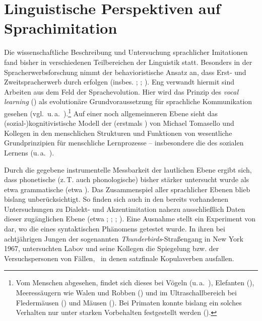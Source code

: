 \section{Linguistische Perspektiven auf Sprachimitation}\label{forschungsgeschichteimitation}
 
Die wissenschaftliche Beschreibung und Untersuchung sprachlicher Imitationen fand bisher in verschiedenen Teilbereichen der Linguistik statt. Besonders in der Spracherwerbsforschung nimmt der behavioristische Ansatz an, dass Erst- und Zweitspracherwerb durch  erfolgen (insbes. \citealt{Fraseretal1963,Uzgiris1981}; \citealt[291–294]{Tauten1997}; \citealt{Markham1997,LightbownSpada2006,MeltzoffMoore1977,MeltzoffMoore1983,MeltzoffMoore1989,MetzoffPrinz2002}). Eng verwandt hiermit sind Arbeiten aus dem Feld der Sprachevolution.
 Hier wird das Prinzip des \textit{vocal learning} () als evolutionäre Grundvoraussetzung für sprachliche Kommunikation gesehen (vgl.\, u.\,a.\, \citealt{Fitch2010,HauserChomskyFitch2002,Petkov2012}).\footnote{Vom Menschen abgesehen, findet sich dieses bei Vögeln (u.\,a.\, \citealt{Lipkind2013}), Elefanten (\citealt{Poole2005}), Meeressäugern wie Walen und Robben (\citealt{JanikSlater1997,Ralls1985}) und im Ultraschallbereich bei Fledermäusen (\citealt{Boughman1998}) und Mäusen (\citealt{Arriaga2012}). Bei Primaten konnte bislang ein solches Verhalten nur unter starken Vorbehalten festgestellt werden (\citealt{Crockford2004,Petkov2012}).} Auf einer noch allgemeinneren Ebene sieht das (sozial-)kognitivistische Modell der  (erstmals \citealt{Tomaselloetal1993}) von Michael Tomasello und Kollegen in den menschlichen Strukturen und Funktionen von  wesentliche Grundprinzipien für  menschliche Lernprozesse – insbesondere die des sozialen Lernens (u.\,a.\,  \citealt[123]{TomaselloCarpenter2007,Tomaselloetal2005,Carpenter2006,Uzgiris1981}). %
 

Durch die gegebene instrumentelle Messbarkeit der lautlichen Ebene ergibt sich, dass phonetische (z.\,T. auch phonologische)  bisher stärker untersucht wurde als etwa grammatische (etwa \citealt{Tilmanns2013,Reiterer2012,Nielsen2011,Babel2012}). Das Zusammenspiel aller sprachlicher Ebenen blieb bislang unberücksichtigt. So finden sich auch in den bereits vorhandenen Untersuchungen zu Dialekt- und Akzentimitation nahezu ausschließlich Daten dieser zugänglichen Ebene (etwa \citealt{Babel2011,Purschke2010,Neuhauser2012,Segerup1999,Dossey2012,Siegel2010}; \citealt[12–14, 40]{Trudgill2006}; \citealt{Adank2010}; \citealt[63, 75]{labov1972a}). Eine Ausnahme stellt ein Experiment von \textcite[310–334]{Labov1968_1} dar, wo die  eines syntaktischen Phänomens getestet wurde. In ihren  bei  achtjährigen Jungen der sogenannten \textit{Thunderbirds}-Straßengang in New York 1967, untersuchten Labov und seine Kollegen die Spiegelung bzw.  der Versuchspersonen von Fällen, \,%
 in denen  satzfinale Kopulaverben ausfallen.  

